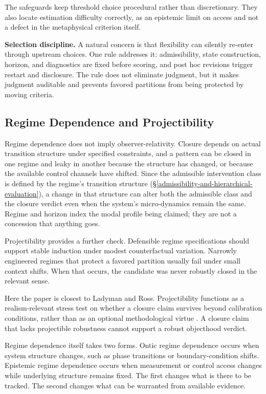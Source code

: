 The safeguards keep threshold choice procedural rather than
discretionary. They also locate estimation difficulty correctly, as an
epistemic limit on access and not a defect in the metaphysical criterion
itself.

\textbf{Selection discipline.} A natural concern is that flexibility
can silently re-enter through upstream choices. One rule addresses it:
admissibility, state construction, horizon, and diagnostics are fixed
before scoring, and post hoc revisions trigger restart and disclosure.
The rule does not eliminate judgment, but it makes judgment auditable
and prevents favored partitions from being protected by moving criteria.

\subsection{Regime Dependence and
	Projectibility}\label{regime-dependence-and-projectibility}

Regime dependence does not imply observer-relativity. Closure depends on
actual transition structure under specified constraints, and a pattern
can be closed in one regime and leaky in another because the structure
has changed, or because the available control
channels have shifted. Since the admissible intervention class is defined by the
regime's transition structure
(\S\ref{admissibility-and-hierarchical-evaluation}), a change in that
structure can alter both the admissible class and the closure verdict even when the
system's micro-dynamics remain the same. Regime and horizon index the
modal profile being claimed; they are not a concession that anything
goes.

Projectibility provides a further check. Defensible regime
specifications should support stable induction under modest
counterfactual variation. Narrowly engineered regimes that protect a
favored partition usually fail under small context shifts. When that
occurs, the candidate was never robustly closed in the relevant sense.

Here the paper is closest to Ladyman and Ross. Projectibility functions
as a realism-relevant stress test on whether a closure claim survives
beyond calibration conditions, rather than as an optional methodological
virtue \citep{ladyman2007}. A closure claim that lacks projectible
robustness cannot support a robust objecthood verdict.

Regime dependence itself takes two forms. Ontic regime
dependence occurs when system structure changes, such as phase
transitions or boundary-condition shifts. Epistemic regime dependence
occurs when measurement or control access changes while underlying
structure remains fixed. The first changes what is there to be tracked.
The second changes what can be warranted from available evidence.

